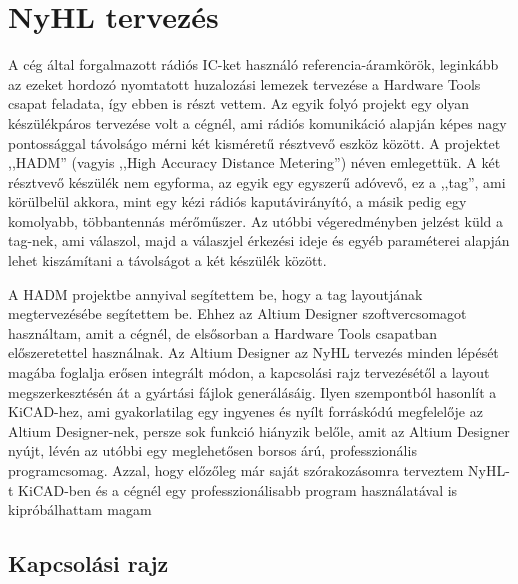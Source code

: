    \section{NyHL tervezés}
        A cég által forgalmazott rádiós IC-ket használó referencia-áramkörök, leginkább az ezeket hordozó nyomtatott huzalozási lemezek tervezése a Hardware Tools csapat feladata, így ebben is részt vettem. Az egyik folyó projekt egy olyan készülékpáros tervezése volt a cégnél, ami rádiós komunikáció alapján képes nagy pontossággal távolságo mérni két kisméretű résztvevő eszköz között. A projektet ,,HADM'' (vagyis ,,High Accuracy Distance Metering'') néven emlegettük. A két résztvevő készülék nem egyforma, az egyik egy egyszerű adóvevő, ez a ,,tag'', ami körülbelül akkora, mint egy kézi rádiós kaputávirányító, a másik pedig egy komolyabb, többantennás mérőműszer. Az utóbbi végeredményben jelzést küld a tag-nek, ami válaszol, majd a válaszjel érkezési ideje és egyéb paraméterei alapján lehet kiszámítani a távolságot a két készülék között.
        \par
        A HADM projektbe annyival segítettem be, hogy a tag layoutjának megtervezésébe segítettem be. Ehhez az Altium Designer szoftvercsomagot használtam, amit a cégnél, de elsősorban a Hardware Tools csapatban előszeretettel használnak. Az Altium Designer az NyHL tervezés minden lépését magába foglalja erősen integrált módon, a kapcsolási rajz tervezésétől a layout megszerkesztésén át a gyártási fájlok generálásáig. Ilyen szempontból hasonlít a KiCAD-hez, ami gyakorlatilag egy ingyenes és nyílt forráskódú megfelelője az Altium Designer-nek, persze sok funkció hiányzik belőle, amit az Altium Designer nyújt, lévén az utóbbi egy meglehetősen borsos árú, professzionális programcsomag. Azzal, hogy előzőleg már saját szórakozásomra terveztem NyHL-t KiCAD-ben és a cégnél egy professzionálisabb program használatával is kipróbálhattam magam
        \subsection{Kapcsolási rajz}

